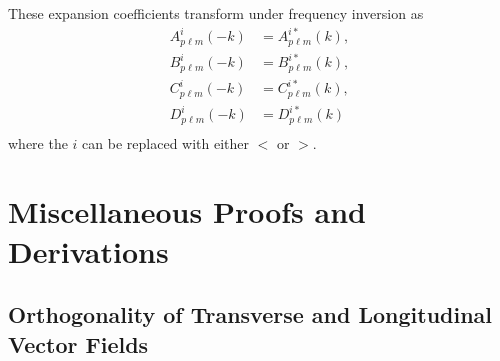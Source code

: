 \documentclass{article}
\begin{document}
These expansion coefficients transform under frequency inversion as
\begin{equation}
\begin{split}
A_{p\ell m}^i(-k) &= A_{p\ell m}^{i*}(k),\\
B_{p\ell m}^i(-k) &= B_{p\ell m}^{i*}(k),\\
C_{p\ell m}^i(-k) &= C_{p\ell m}^{i*}(k),\\
D_{p\ell m}^i(-k) &= D_{p\ell m}^{i*}(k)\\
\end{split}
\end{equation}
where the $i$ can be replaced with either $<$ or $>$.












\section{Miscellaneous Proofs and Derivations}

\subsection{Orthogonality of Transverse and Longitudinal Vector Fields}\label{sec:helmholtzOrthogonality}
\end{document}
